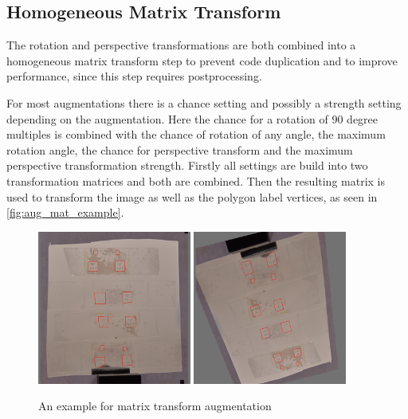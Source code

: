\documentclass[10pt]{book}
\begin{document}
\subsection{Homogeneous Matrix Transform}

The rotation and perspective transformations are both combined into a homogeneous matrix transform step to prevent code duplication and to improve performance, since this step requires postprocessing.

For most augmentations there is a chance setting and possibly a strength setting depending on the augmentation. Here the chance for a rotation of 90 degree multiples is combined with the chance of rotation of any angle, the maximum rotation angle, the chance for perspective transform and the maximum perspective transformation strength. Firstly all settings are build into two transformation matrices and both are combined. Then the resulting matrix is used to transform the image as well as the polygon label vertices, as seen in \autoref{fig:aug_mat_example}.

\begin{figure}
  \centering
     {\includegraphics[width=0.45\textwidth]{image/aug_mat_before}}
     {\includegraphics[width=0.45\textwidth]{image/aug_mat_after}}
  \caption{An example for matrix transform augmentation}
  \label{fig:aug_mat_example}
\end{figure}
\end{document}
